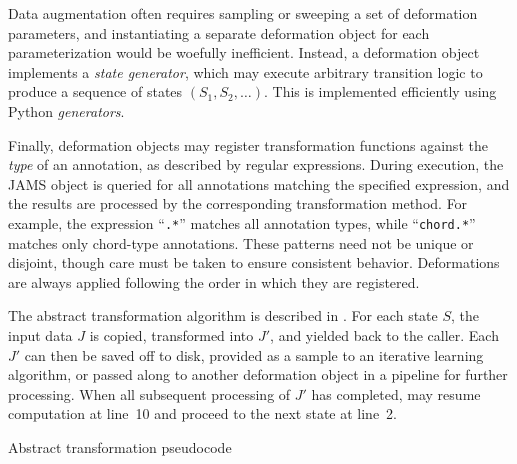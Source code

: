 \documentclass{article}
\begin{document}
Data augmentation often requires sampling or sweeping a set of deformation 
parameters, and instantiating a separate deformation object for each parameterization 
would be woefully inefficient.
Instead, a deformation object implements a \emph{state generator},
which may execute arbitrary transition logic to produce a sequence of 
states $(S_1, S_2, \dots)$.
This is implemented efficiently using Python \emph{generators}.

Finally, deformation objects may register transformation functions against the 
\emph{type} of an annotation, as described by regular expressions.
During execution, the JAMS object is queried for all annotations matching the specified
expression, and the results are processed by the corresponding transformation method.
For example, the expression ``\texttt{.*}'' matches all annotation types, while 
``\texttt{chord.*}'' matches only chord-type annotations.
These patterns need not be unique or disjoint, though care must be taken
to ensure consistent behavior.
Deformations are always applied following the order in which they are registered.

The abstract transformation algorithm is described in .
For each state $S$, the input data $J$ is copied, transformed into $J'$, and yielded back to the caller. 
Each $J'$ can then be saved off to disk, provided as a sample to an iterative learning 
algorithm, or passed along to another deformation object in a pipeline for further processing.
When all subsequent processing of $J'$ has completed,  may resume
computation at line~10 and proceed to the next state at line~2.

\begin{algorithm}[t]
\caption{Abstract transformation pseudocode\label{alg:transformation}}
\begin{algorithmic}[1]
            \EndFor{}
        \EndFor{}
    \EndFor{}
    \EndFunction{}
\end{algorithmic}
\end{algorithm}
\end{document}
